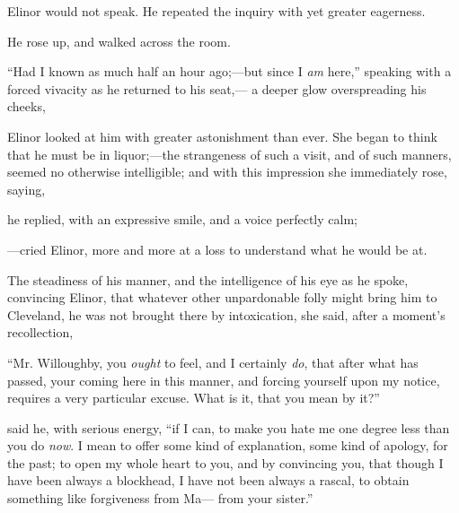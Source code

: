 Elinor would not speak. He repeated the inquiry with yet greater eagerness.



He rose up, and walked across the room.

“Had I known as much half an hour ago;---but since I {\em am} here,” speaking with a forced vivacity as he returned to his seat,--- a deeper glow overspreading his cheeks, 

Elinor looked at him with greater astonishment than ever. She began to think that he must be in liquor;---the strangeness of such a visit, and of such manners, seemed no otherwise intelligible; and with this impression she immediately rose, saying,


 he replied, with an expressive smile, and a voice perfectly calm; 

---cried Elinor, more and more at a loss to understand what he would be at.


The steadiness of his manner, and the intelligence of his eye as he spoke, convincing Elinor, that whatever other unpardonable folly might bring him to Cleveland, he was not brought there by intoxication, she said, after a moment's recollection,

“Mr. Willoughby, you {\em ought} to feel, and I certainly {\em do}, that after what has passed, your coming here in this manner, and forcing yourself upon my notice, requires a very particular excuse. What is it, that you mean by it?”

 said he, with serious energy, “if I can, to make you hate me one degree less than you do {\em now}. I mean to offer some kind of explanation, some kind of apology, for the past; to open my whole heart to you, and by convincing you, that though I have been always a blockhead, I have not been always a rascal, to obtain something like forgiveness from Ma--- from your sister.”

